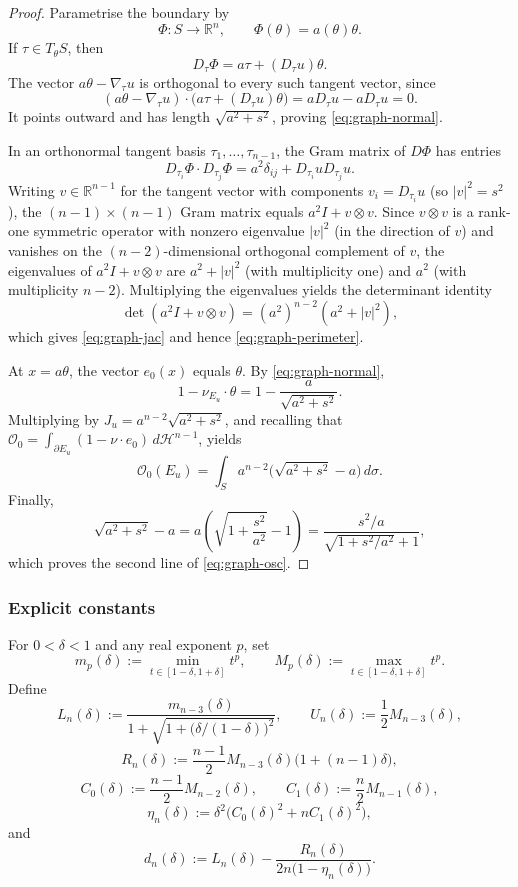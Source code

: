 \documentclass[11pt]{amsart}
\theoremstyle{definition}
\newcommand{\R}{\mathbb R}
\newcommand{\Hn}{\mathcal H^{n-1}}
\newcommand{\osc}{\mathcal O}
\begin{document}
\begin{proof}
Parametrise the boundary by
\[
   \Phi:S\to\R^n,\qquad \Phi(\theta)=a(\theta)\theta.
\]
If \(\tau\in T_\theta S\), then
\[
   D_\tau\Phi=a\tau+(D_\tau u)\theta.
\]
The vector \(a\theta-\nabla_\tau u\) is orthogonal to every such tangent
vector, since
\[
   (a\theta-\nabla_\tau u)\cdot
   \bigl(a\tau+(D_\tau u)\theta\bigr)
   =aD_\tau u-aD_\tau u=0.
\]
It points outward and has length \(\sqrt{a^2+s^2}\), proving
\eqref{eq:graph-normal}.

In an orthonormal tangent basis \(\tau_1,\ldots,\tau_{n-1}\), the Gram matrix
of \(D\Phi\) has entries
\[
   D_{\tau_i}\Phi\cdot D_{\tau_j}\Phi
   =a^2\delta_{ij}+D_{\tau_i}uD_{\tau_j}u.
\]
Writing \(v\in\R^{n-1}\) for the tangent vector with components
\(v_i=D_{\tau_i}u\) (so \(|v|^2=s^2\)), the \((n-1)\times(n-1)\) Gram matrix
equals \(a^2 I + v\otimes v\).  Since \(v\otimes v\) is a rank-one symmetric
operator with nonzero eigenvalue \(|v|^2\) (in the direction of \(v\)) and
vanishes on the \((n-2)\)-dimensional orthogonal complement of \(v\), the
eigenvalues of \(a^2 I + v\otimes v\) are \(a^2+|v|^2\) (with multiplicity
one) and \(a^2\) (with multiplicity \(n-2\)).  Multiplying the eigenvalues
yields the determinant identity
\[
   \det(a^2I+v\otimes v)=(a^2)^{n-2}(a^2+|v|^2),
\]
which gives \eqref{eq:graph-jac} and hence \eqref{eq:graph-perimeter}.

At \(x=a\theta\), the vector \(e_0(x)\) equals \(\theta\).  By
\eqref{eq:graph-normal},
\[
   1-\nu_{E_u}\cdot\theta
   =1-\frac{a}{\sqrt{a^2+s^2}}.
\]
Multiplying by \(J_u=a^{n-2}\sqrt{a^2+s^2}\), and recalling that
\(\osc_0=\int_{\partial E_u}(1-\nu\cdot e_0)\,d\Hn\), yields
\[
   \osc_0(E_u)
   =\int_Sa^{n-2}\bigl(\sqrt{a^2+s^2}-a\bigr)\,d\sigma.
\]
Finally,
\[
   \sqrt{a^2+s^2}-a
   =a\left(\sqrt{1+\frac{s^2}{a^2}}-1\right)
   =\frac{s^2/a}{\sqrt{1+s^2/a^2}+1},
\]
which proves the second line of \eqref{eq:graph-osc}.
\end{proof}

\subsubsection{Explicit constants}

For \(0<\delta<1\) and any real exponent \(p\), set
\[
   m_p(\delta):=\min_{t\in[1-\delta,1+\delta]}t^p,\qquad
   M_p(\delta):=\max_{t\in[1-\delta,1+\delta]}t^p.
\tag{3.11}\label{eq:mM}
\]
Define
\[
   L_n(\delta):=
   \frac{m_{n-3}(\delta)}
        {1+\sqrt{1+\bigl(\delta/(1-\delta)\bigr)^2}},
   \qquad
   U_n(\delta):=\frac12M_{n-3}(\delta),
\tag{3.12}\label{eq:LU}
\]
\[
   R_n(\delta):=
   \frac{n-1}{2}M_{n-3}(\delta)\bigl(1+(n-1)\delta\bigr),
\tag{3.13}\label{eq:R}
\]
\[
   C_0(\delta):=\frac{n-1}{2}M_{n-2}(\delta),\qquad
   C_1(\delta):=\frac n2M_{n-1}(\delta),
\tag{3.14}\label{eq:C01}
\]
\[
   \eta_n(\delta):=
   \delta^2\bigl(C_0(\delta)^2+nC_1(\delta)^2\bigr),
\tag{3.15}\label{eq:eta}
\]
and
\[
   d_n(\delta):=
   L_n(\delta)-\frac{R_n(\delta)}
   {2n\bigl(1-\eta_n(\delta)\bigr)}.
\tag{3.16}\label{eq:dn}
\]
\end{document}
